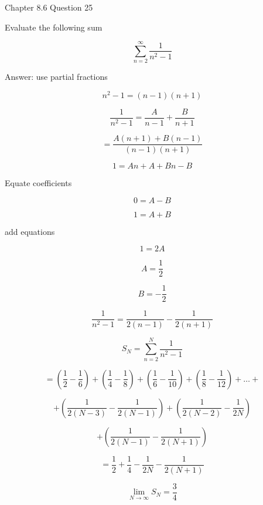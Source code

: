 \documentclass[12pt]{article}
\begin{document}
\noindent Chapter 8.6 Question 25

\noindent Evaluate the following sum

\[
\sum _ {n = 2} ^ {\infty} \frac {1} {{n} ^ {2} - 1}
\]

\noindent Answer: use partial fractions

\[
{n} ^ {2} - 1 = \left( n - 1 \right) \left( n + 1 \right)
\]

\[
\frac {1} {{n} ^ {2} - 1} = \frac {A} {n - 1} + \frac {B} {n + 1}
\]

\[
 = \frac {A \left( n + 1 \right) + B \left( n - 1 \right)} {\left( n - 1 \right) \left( n + 1 \right)}
\]

\[
1 = A n + A + B n - B
\]

\noindent Equate coefficients

\[
0 = A - B
\]

\[
1 = A + B
\]

\noindent add equations

\[
1 = 2 A
\]

\[
A = \frac {1} {2}
\]

\[
B =  - \frac {1} {2}
\]

\[
\frac {1} {{n} ^ 2 - 1} = \frac {1} {2 \left( n - 1 \right)} - \frac {1} {2 \left( n + 1 \right)}
\]

\[
{S} _ {N} = \sum _ {n = 2} ^ {N} \frac {1} {{n} ^ {2} - 1}
\]

\[
 = \left( \frac {1} {2} - \frac {1} {6} \right) + \left( \frac {1} {4} - \frac {1} {8} \right) + \left( \frac {1} {6} - \frac {1} {10} \right) + \left( \frac {1} {8} - \frac {1} {12} \right) + \dots + 
\]

\[
 + \left( \frac {1} {2 \left( N - 3 \right)} - \frac {1} {2 \left( N - 1 \right)} \right) + \left( \frac {1} {2 \left( N - 2 \right)} - \frac {1} {2 N} \right)
\]

\[
 + \left( \frac {1} {2 \left( N - 1 \right)} - \frac {1} {2 \left( N + 1 \right)} \right)
\]

\[
 = \frac {1} {2} + \frac {1} {4} - \frac {1} {2 N} - \frac {1} {2 \left( N + 1 \right)}
\]

\[
\lim _ {N \to \infty} {S} _ {N} = \frac {3} {4}
\]
\end{document}

